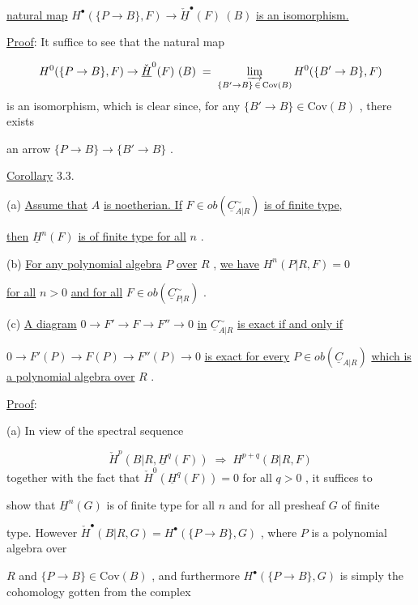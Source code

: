 \underline{natural map}  $H^{\bullet}(\{P \to B\},F) \to \check{\underline{H}}^{\bullet}(F)\ (B)$  \underline{is an isomorphism.}

\underline{Proof}:  It suffice to see that the natural map

\begin{equation*}
H^{0}(\{P \to B\},F) \to \check{\underline{H}}^{0}(F)\ (B) \;=\; \varinjlim_{\{B' \to B\}\, \in\, \mathrm{Cov}(B)} H^{0}(\{B' \to B\},F)
\end{equation*}
is an isomorphism, which is clear since, for any  $\{B' \to B\} \in \mathrm{Cov}(B)$  , there exists

an arrow  $\{P \to B\} \to \{B' \to B\}$  .


\underline{Corollary} 3.3.

(a)  \underline{Assume that}  $A$  \underline{is noetherian. If}  $F \in ob(\underline{C}^{\sim}_{A|R})$  \underline{is of finite type,}

\underline{then}  $\underline{H}^{n}(F)$  \underline{is of finite type for all}  $n$  .

(b)  \underline{For any polynomial algebra}  $P$  \underline{over}  $R$  , \underline{we have}  $H^{n}(P|R,F) = 0$

\underline{for all}  $n > 0$  \underline{and for all}  $F \in ob(\underline{C}^{\sim}_{P|R})$  .

(c)  \underline{A diagram}  $0 \to F' \to F \to F'' \to 0$  \underline{in}  $\underline{C}^{\sim}_{A|R}$  \underline{is exact if and only if}

$0 \to F'(P) \to F(P) \to F''(P) \to 0$  \underline{is exact for every}  $P \in ob(\underline{C}_{A|R})$  \underline{which is a polynomial algebra over}  $R$  .

\underline{Proof}:

(a)  In view of the spectral sequence

\begin{equation*}
\check{H}^{p}(B|R,\underline{H}^{q}(F)) \;\Rightarrow\; H^{p+q}(B|R,F)
\end{equation*}
together with the fact that  $\check{H}^{0}(\underline{H}^{q}(F)) = 0$  for all  $q > 0$  , it suffices to

show that  $\underline{H}^{n}(G)$  is of finite type for all  $n$  and for all presheaf  $G$  of finite

type. However  $\check{H}^{\bullet}(B|R,G) = H^{\bullet}(\{P \to B\},G)$  , where  $P$  is a polynomial algebra over

$R$  and  $\{P \to B\} \in \mathrm{Cov}(B)$  , and furthermore  $H^{\bullet}(\{P \to B\},G)$  is simply the
cohomology gotten from the complex

